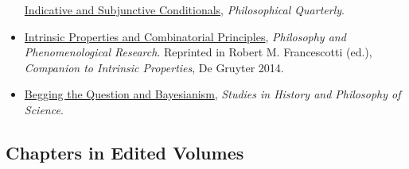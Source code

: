 \documentclass[
  10pt,
  letterpaper,
  DIV=11,
  numbers=noendperiod,
  twoside]{scrartcl}
\begin{document}
\begin{itemize}
  \href{https://brian.weatherson.org/quarto/posts/indsub/indicative-and-subjunctive-conditionals.html}{Indicative
  and Subjunctive Conditionals}, \emph{Philosophical Quarterly}.
\item
  \href{https://brian.weatherson.org/quarto/posts/ipacp/intrinsic-properties-and-combinatorial-principles.html}{Intrinsic
  Properties and Combinatorial Principles}, \emph{Philosophy and
  Phenomenological Research}. Reprinted in Robert M. Francescotti (ed.),
  \emph{Companion to Intrinsic Properties}, De Gruyter 2014.
\item
  \href{https://brian.weatherson.org/quarto/posts/bqb/begging-the-question-and-bayesians.html}{Begging
  the Question and Bayesianism}, \emph{Studies in History and Philosophy
  of Science}.
\end{itemize}

\subsection{Chapters in Edited
Volumes}\label{chapters-in-edited-volumes}
\end{document}
